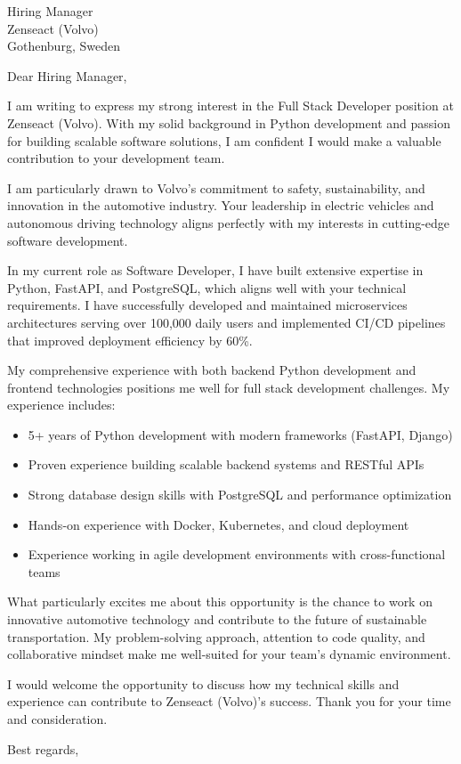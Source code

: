 \documentclass[11pt,a4paper]{letter}
\begin{document}
\begin{letter}{Hiring Manager \\ Zenseact (Volvo) \\ Gothenburg, Sweden}

\opening{Dear Hiring Manager,}

I am writing to express my strong interest in the Full Stack Developer position at Zenseact (Volvo). With my solid background in Python development and passion for building scalable software solutions, I am confident I would make a valuable contribution to your development team.

I am particularly drawn to Volvo's commitment to safety, sustainability, and innovation in the automotive industry. Your leadership in electric vehicles and autonomous driving technology aligns perfectly with my interests in cutting-edge software development.

In my current role as Software Developer, I have built extensive expertise in Python, FastAPI, and PostgreSQL, which aligns well with your technical requirements. I have successfully developed and maintained microservices architectures serving over 100,000 daily users and implemented CI/CD pipelines that improved deployment efficiency by 60\%.

My comprehensive experience with both backend Python development and frontend technologies positions me well for full stack development challenges. My experience includes:

\begin{itemize}
\item 5+ years of Python development with modern frameworks (FastAPI, Django)
\item Proven experience building scalable backend systems and RESTful APIs
\item Strong database design skills with PostgreSQL and performance optimization
\item Hands-on experience with Docker, Kubernetes, and cloud deployment
\item Experience working in agile development environments with cross-functional teams
\end{itemize}

What particularly excites me about this opportunity is the chance to work on innovative automotive technology and contribute to the future of sustainable transportation. My problem-solving approach, attention to code quality, and collaborative mindset make me well-suited for your team's dynamic environment.

I would welcome the opportunity to discuss how my technical skills and experience can contribute to Zenseact (Volvo)'s success. Thank you for your time and consideration.

\closing{Best regards,}

\end{letter}
\end{document}
